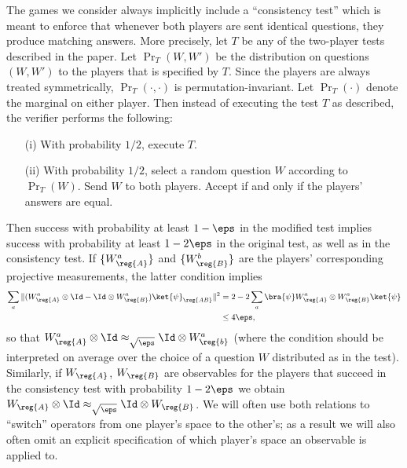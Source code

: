 The games we consider always implicitly include a ``consistency test'' which is meant to enforce that whenever both players are sent identical questions, they produce matching answers. More precisely, let $T$ be any of the two-player tests described in the paper. Let $\Pr_T(W,W')$ be the distribution on questions $(W,W')$ to the players that is specified by $T$. Since the players are always treated symmetrically, $\Pr_T(\cdot,\cdot)$ is permutation-invariant. Let $\Pr_T(\cdot)$ denote the marginal on either player. Then instead of executing the test $T$ as described, the verifier performs the following:
\begin{enumerate}
\item[(i)] With probability $1/2$, execute $T$.
\item[(ii)] With probability $1/2$, select a random question $W$ according to $\Pr_T(W)$. Send $W$ to both players. Accept if and only if the players' answers are equal. 
\end{enumerate}
Then success with probability at least $1-\eps$ in the modified test implies success with probability at least $1-2\eps$ in the original test, as well as in the consistency test. If $\{W_{\reg{A}}^a\}$ and $\{W_{\reg{B}}^b\}$ are the players' corresponding projective measurements, the latter condition implies 
\begin{align}
\sum_a \|(W_{\reg{A}}^a \otimes \Id - \Id \otimes W_{\reg{B}}^a)\ket{\psi}_{\reg{AB}}\|^2 &= 2-2 \sum_a \bra{\psi} W_{\reg{A}}^a \otimes W_{\reg{B}}^a \ket{\psi} \notag\\ 
&\leq 4 \eps,\label{eq:consistency}
\end{align}
so that $W_{\reg{A}}^a \otimes \Id \approx_{\sqrt{\eps}} \Id \otimes W_{\reg{b}}^a$ (where the condition should be interpreted on average over the choice of a question $W$ distributed as in the test). Similarly, if $W_{\reg{A}}$, $W_{\reg{B}}$ are observables for the players that succeed in the consistency test with probability $1-2\eps$ we obtain $W_{\reg{A}}\otimes \Id \approx_{\sqrt{\eps}} \Id \otimes W_{\reg{B}}$. We will often use both relations to ``switch'' operators from one player's space to the other's; as a result we will also often omit an explicit specification of which player's space an observable is applied to. 

